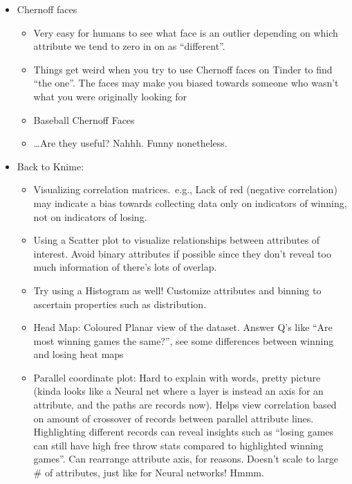 \begin{itemize}
  \item Chernoff faces
        \begin{itemize}
          \item Very easy for humans to see what face is an outlier depending on which attribute we tend to zero in on as ``different''.
          \item Things get weird when you try to use Chernoff faces on Tinder to find ``the one''. The faces may make you biased towards someone who wasn't what you were originally looking for
          \item Baseball Chernoff Faces
          \item \ldots Are they useful? Nahhh. Funny nonetheless.
        \end{itemize}
  \item Back to Knime:
        \begin{itemize}
          \item Visualizing correlation matrices.\ e.g., Lack of red (negative correlation) may indicate a bias towards collecting data only on indicators of winning, not on indicators of losing.
          \item Using a Scatter plot to visualize relationships between attributes of interest. Avoid binary attributes if possible since they don't reveal too much information of there's lots of overlap.
          \item Try using a Histogram as well! Customize attributes and binning to ascertain properties such as distribution.
          \item Head Map: Coloured Planar view of the dataset. Answer Q's like ``Are most winning games the same?'', see some differences between winning and losing heat maps
          \item Parallel coordinate plot: Hard to explain with words, pretty picture (kinda looks like a Neural net where a layer is instead an axis for an attribute, and the paths are records now). Helps view correlation based on amount of crossover of records between parallel attribute lines. Highlighting different records can reveal insights such as ``losing games can still have high free throw stats compared to highlighted winning games''. Can rearrange attribute axis, for reasons. Doesn't scale to large \# of attributes, just like for Neural networks! Hmmm.
        \end{itemize}
\end{itemize}
